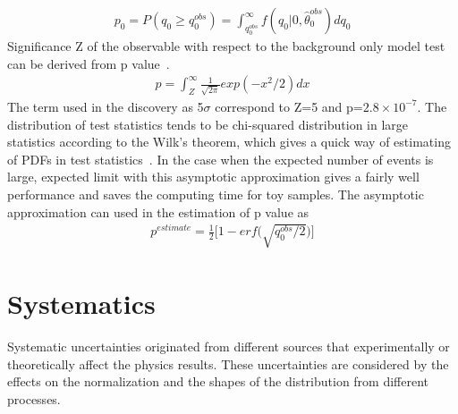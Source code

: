 \begin{align*}
p_{0}=P(q_{0}\geq q_{0}^{obs})=\int^{\infty}_{q_{0}^{obs}}f(q_{0}|0,\hat{\theta}_{0}^{obs})d q_{0}
\end{align*}  
Significance Z of the observable with respect to the background only model test can be derived from p value~\cite{CMS-NOTE-2011-005}.
\begin{align*}
p=\int^{\infty}_{Z}\frac{1}{\sqrt{2\pi}}exp(-x^2/2)dx
\end{align*}  
The term used in the discovery as 5$\sigma$ correspond to Z=5 and p=$2.8\times10^{-7}$. The distribution of test statistics tends to be chi-squared distribution in large statistics according to the Wilk's theorem, which gives a quick way of estimating of PDFs in test statistics~\cite{LHCstaticstics}. In the case when the expected number of events is large, expected limit with this asymptotic approximation gives a fairly well performance and saves the computing time for toy samples. The asymptotic approximation can used in the estimation of p value as
\begin{align*}
p^{estimate}=\frac{1}{2}\bigg[1-erf\bigg(\sqrt{q_{0}^{obs}/2}\bigg)\bigg]
\end{align*}  



\section{Systematics}
Systematic uncertainties originated from different sources that experimentally or theoretically affect the physics results. These uncertainties are considered by the effects on the normalization and the shapes of the distribution from different processes. 

